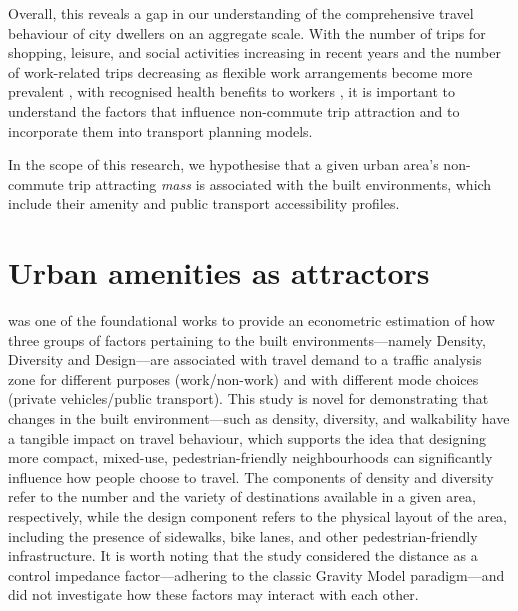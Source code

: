 Overall, this reveals a gap in our understanding of the comprehensive travel behaviour of city dwellers on an aggregate scale. With the number of trips for shopping, leisure, and social activities increasing in recent years and the number of work-related trips decreasing as flexible work arrangements become more prevalent \citep{wohnerWorkFlexiblyTravel2022}, with recognised health benefits to workers \citep{macleodCommutingWorkPostpandemic2022}, it is important to understand the factors that influence non-commute trip attraction and to incorporate them into transport planning models.  

In the scope of this research, we hypothesise that a given urban area's non-commute trip attracting \textit{mass} is associated with the built environments, which include their amenity and public transport accessibility profiles. 

\section{Urban amenities as attractors}

\cite{cerveroTravelDemand3Ds1997} was one of the foundational works to provide an econometric estimation of how three groups of factors pertaining to the built environments---namely Density, Diversity and Design---are associated with travel demand to a traffic analysis zone for different purposes (work/non-work) and with different mode choices (private vehicles/public transport). This study is novel for demonstrating that changes in the built environment—such as density, diversity, and walkability have a tangible impact on travel behaviour, which supports the idea that designing more compact, mixed-use, pedestrian-friendly neighbourhoods can significantly influence how people choose to travel. The components of density and diversity refer to the number and the variety of destinations available in a given area, respectively, while the design component refers to the physical layout of the area, including the presence of sidewalks, bike lanes, and other pedestrian-friendly infrastructure. It is worth noting that the study considered the distance as a control impedance factor---adhering to the classic Gravity Model paradigm---and did not investigate how these factors may interact with each other.

